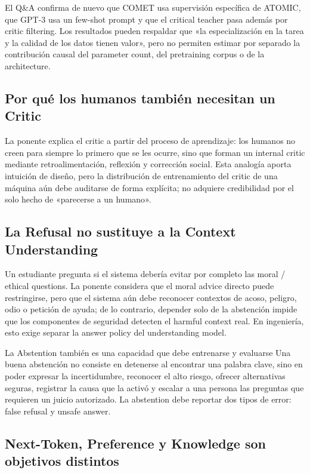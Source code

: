 \documentclass[a4paper]{article}
\begin{document}
El Q\&A confirma de nuevo que COMET usa supervisión específica de ATOMIC, que GPT-3 usa un few-shot prompt y que el critical teacher pasa además por critic filtering. Los resultados pueden respaldar que «la especialización en la tarea y la calidad de los datos tienen valor», pero no permiten estimar por separado la contribución causal del parameter count, del pretraining corpus o de la architecture.

\subsection{Por qué los humanos también necesitan un Critic}

La ponente explica el critic a partir del proceso de aprendizaje: los humanos no creen para siempre lo primero que se les ocurre, sino que forman un internal critic mediante retroalimentación, reflexión y corrección social. Esta analogía aporta intuición de diseño, pero la distribución de entrenamiento del critic de una máquina aún debe auditarse de forma explícita; no adquiere credibilidad por el solo hecho de «parecerse a un humano».

\subsection{La Refusal no sustituye a la Context Understanding}

Un estudiante pregunta si el sistema debería evitar por completo las moral / ethical questions. La ponente considera que el moral advice directo puede restringirse, pero que el sistema aún debe reconocer contextos de acoso, peligro, odio o petición de ayuda; de lo contrario, depender solo de la abstención impide que los componentes de seguridad detecten el harmful context real. En ingeniería, esto exige separar la answer policy del understanding model.

\begin{importantbox}{La Abstention también es una capacidad que debe entrenarse y evaluarse}
Una buena abstención no consiste en detenerse al encontrar una palabra clave, sino en poder expresar la incertidumbre, reconocer el alto riesgo, ofrecer alternativas seguras, registrar la causa que la activó y escalar a una persona las preguntas que requieren un juicio autorizado. La abstention debe reportar dos tipos de error: false refusal y unsafe answer.
\end{importantbox}

\subsection{Next-Token, Preference y Knowledge son objetivos distintos}
\end{document}
